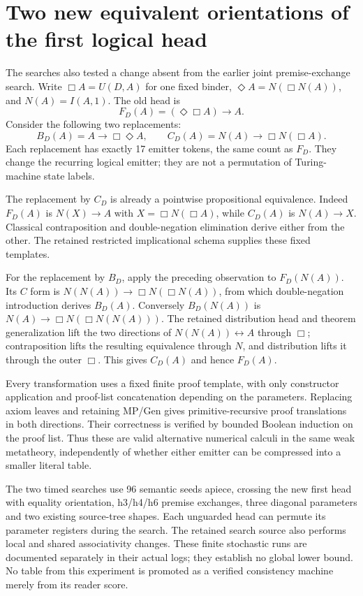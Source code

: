 \section{Two new equivalent orientations of the first logical head}

The searches also tested a change absent from the earlier joint
premise-exchange search.  Write $\Box A=U(D,A)$ for one fixed binder,
$\Diamond A=N(\Box N(A))$, and $N(A)=I(A,1)$.  The old head is
\[
 F_D(A)=(\Diamond\Box A)\to A.
\]
Consider the following two replacements:
\[
 B_D(A)=A\to\Box\Diamond A,
 \qquad C_D(A)=N(A)\to\Box N(\Box A).
\]
Each replacement has exactly 17 emitter tokens, the same count as
$F_D$.  They change the recurring logical emitter; they are not a
permutation of Turing-machine state labels.

The replacement by $C_D$ is already a pointwise propositional
equivalence.  Indeed $F_D(A)$ is
$N(X)\to A$ with $X=\Box N(\Box A)$, while $C_D(A)$ is
$N(A)\to X$.  Classical contraposition and double-negation
elimination derive either from the other.  The retained restricted
implicational schema supplies these fixed templates.

For the replacement by $B_D$, apply the preceding observation to
$F_D(N(A))$.  Its $C$ form is
$N(N(A))\to\Box N(\Box N(A))$, from which double-negation
introduction derives $B_D(A)$.  Conversely $B_D(N(A))$ is
$N(A)\to\Box N(\Box N(N(A)))$.
The retained distribution head and theorem generalization lift the
two directions of $N(N(A))\leftrightarrow A$ through $\Box$;
contraposition lifts the resulting equivalence through $N$, and
distribution lifts it through the outer $\Box$.
This gives $C_D(A)$ and hence $F_D(A)$.

Every transformation uses a fixed finite proof template, with only
constructor application and proof-list concatenation depending on
the parameters.  Replacing axiom leaves and retaining MP/Gen gives
primitive-recursive proof translations in both directions.  Their
correctness is verified by bounded Boolean induction on the proof
list.  Thus these are valid alternative numerical calculi in the
same weak metatheory, independently of whether either emitter can
be compressed into a smaller literal table.

The two timed searches use 96 semantic seeds apiece, crossing the
new first head with equality orientation, h3/h4/h6 premise exchanges,
three diagonal parameters and two existing source-tree shapes.
Each unguarded head can permute its parameter registers during
the search.  The retained search source also performs local and
shared associativity changes.  These finite stochastic runs are
documented separately in their actual logs; they establish no
global lower bound.  No table from this experiment is promoted
as a verified consistency machine merely from its reader score.
